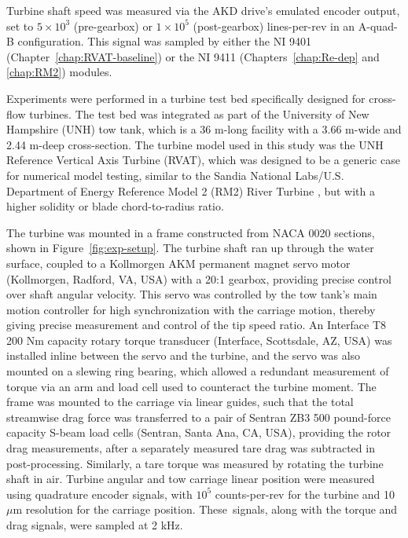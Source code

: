 Turbine shaft speed was measured via the AKD drive's emulated encoder output,
set to $5 \times 10^3$ (pre-gearbox) or $1 \times 10^5$ (post-gearbox)
lines-per-rev in an A-quad-B configuration. This signal was sampled by either
the NI 9401 (Chapter~\ref{chap:RVAT-baseline}) or the NI 9411
(Chapters~\ref{chap:Re-dep} and \ref{chap:RM2}) modules.



Experiments were performed in a turbine test bed specifically designed for
cross-flow turbines. The test bed was integrated as part of the University of
New Hampshire (UNH) tow tank, which is a 36 m-long facility with a 3.66 m-wide
and 2.44 m-deep cross-section. The turbine model used in this study was the UNH
Reference Vertical Axis Turbine (RVAT), which was designed to be a generic case
for numerical model testing, similar to the Sandia National Labs/U.S. Department
of Energy Reference Model 2 (RM2) River Turbine \cite{Neary2014}, but with a
higher solidity or blade chord-to-radius ratio.

The turbine was mounted in a frame constructed from NACA 0020 sections, shown in
Figure~\ref{fig:exp-setup}. The turbine shaft ran up through the water surface,
coupled to a Kollmorgen AKM permanent magnet servo motor (Kollmorgen, Radford,
VA, USA) with a 20:1 gearbox, providing precise control over shaft angular
velocity. This servo was controlled by the tow tank's main motion controller for
high synchronization with the carriage motion, thereby giving precise
measurement and control of the tip speed ratio. An Interface T8 200 Nm capacity
rotary torque transducer (Interface, Scottsdale, AZ, USA) was installed inline
between the servo and the turbine, and the servo was also mounted on a slewing
ring bearing, which allowed a redundant measurement of torque via an arm and
load cell used to counteract the turbine moment. The frame was mounted to the
carriage via linear guides, such that the total streamwise drag force was
transferred to a pair of Sentran ZB3 500 pound-force capacity S-beam load cells
(Sentran, Santa Ana, CA, USA), providing the rotor drag measurements, after a
separately measured tare drag was subtracted in post-processing. Similarly, a
tare torque was measured by rotating the turbine shaft in air. Turbine angular
and tow carriage linear position were measured using quadrature encoder signals,
with $10^5$ counts-per-rev for the turbine and 10 ${\mu}$m resolution for the
carriage position. These~signals, along with the torque and drag signals, were
sampled at 2 kHz.

